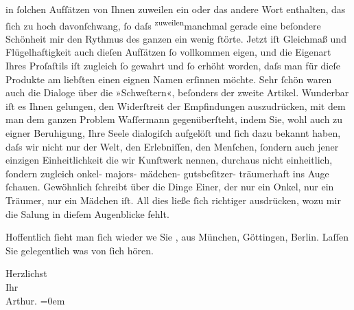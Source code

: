                in ſolchen Aufſätzen von Ihnen zuweilen ein oder das andere Wort enthalten, das ſich
               zu hoch davonſchwang, ſo daſs \substVorne{}\textsuperscript{zuweilen}\substDazwischen{}manchmal\substHinten{} gerade eine beſondere Schönheit mir den Rythmus des ganzen ein wenig ſtörte.
               Jetzt iſt Gleichmaß und {\pb}Flügelhaftigkeit auch dieſen
               Aufſätzen ſo vollkommen eigen,  und die
               Eigenart  Ihres Proſaſtils iſt zugleich ſo gewahrt
               und ſo erhöht worden, daſs man für dieſe Produkte am liebſten einen eignen Namen
               erſinnen möchte. Sehr ſchön waren auch die Dialoge über die »Schweſtern«, beſonders der zweite Artikel. Wunderbar iſt es Ihnen gelungen,
               den Widerſtreit der Empfindungen auszudrücken, mit dem man dem ganzen Problem {\pb}Waſſermann gegenüberſteht, indem Sie, wohl
               auch zu eigner Beruhigung, Ihre Seele dialogiſch aufgelöſt und ſich dazu bekannt
               haben, daſs wir nicht nur der Welt, den Erlebniſſen, den Menſchen, ſondern auch jener
               einzigen Einheitlichkeit die wir Kunſtwerk nennen, durchaus nicht einheitlich,
               ſondern zugleich onkel- majors- mädchen- gutsbeſitzer- träumerhaft ins Auge ſchauen.
               Gewöhnlich ſchreibt über die Dinge Einer, der nur ein Onkel, {\pb}nur ein Träumer, nur ein Mädchen iſt. All dies ließe ſich
               richtiger ausdrücken, wozu mir die Sa{\geminationm}lung in dieſem
               Augenblicke fehlt.\pend
           
\pstart
           Hoffentlich ſieht man ſich wieder we{\geminationn} Sie \label{K_L01638-2v}\label{K_L01638-2}, aus München, Göttingen, Berlin. Laſſen Sie
               gelegentlich was von ſich hören.\pend
           
\pstart
           Herzlichst{\\[\baselineskip]}Ihr{\\[\baselineskip]}\spacefill\mbox{Arthur.}\pend
           \leftskip=0em{}\endnumbering{}  
      